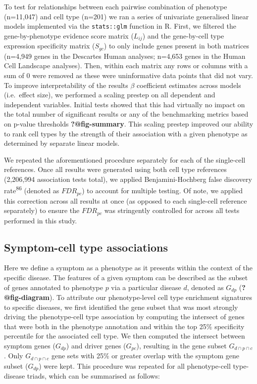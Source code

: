 \documentclass[
]{report}
\begin{document}
To test for relationships between each pairwise combination of phenotype
(n=11,047) and cell type (n=201) we ran a series of univariate
generalised linear models implemented via the \texttt{stats::glm}
function in R. First, we filtered the gene-by-phenotype evidence score
matrix (\(L_{ij}\)) and the gene-by-cell type expression specificity
matrix (\(S_{gc}\)) to only include genes present in both matrices
(n=4,949 genes in the Descartes Human analyses; n=4,653 genes in the
Human Cell Landscape analyses). Then, within each matrix any rows or
columns with a sum of 0 were removed as these were uninformative data
points that did not vary. To improve interpretability of the results
\(\beta\) coefficient estimates across models (i.e.~effect size), we
performed a scaling prestep on all dependent and independent variables.
Initial tests showed that this had virtually no impact on the total
number of significant results or any of the benchmarking metrics based
on p-value thresholds \textbf{?@fig-summary}. This scaling prestep
improved our ability to rank cell types by the strength of their
association with a given phenotype as determined by separate linear
models.

We repeated the aforementioned procedure separately for each of the
single-cell references. Once all results were generated using both cell
type references (2,206,994 association tests total), we applied
Benjamini-Hochberg false discovery rate\textsuperscript{86} (denoted as
\(FDR_{pc}\)) to account for multiple testing. Of note, we applied this
correction across all results at once (as opposed to each single-cell
reference separately) to ensure the \(FDR_{pc}\) was stringently
controlled for across all tests performed in this study.

\subsection{Symptom-cell type
associations}\label{symptom-cell-type-associations}

Here we define a symptom as a phenotype as it presents within the
context of the specific disease. The features of a given symptom can be
described as the subset of genes annotated to phenotype \(p\) via a
particular disease \(d\), denoted as \(G_{dp}\)
(\textbf{?@fig-diagram}). To attribute our phenotype-level cell type
enrichment signatures to specific diseases, we first identified the gene
subset that was most strongly driving the phenotype-cell type
association by computing the intersect of genes that were both in the
phenotype annotation and within the top 25\% specificity percentile for
the associated cell type. We then computed the intersect between symptom
genes (\(G_{dp}\)) and driver genes (\(G_{pc}\)), resulting in the gene
subset \(G_{d \cap p \cap c}\). Only \(G_{d \cap p \cap c}\) gene sets
with 25\% or greater overlap with the symptom gene subset (\(G_{dp}\))
were kept. This procedure was repeated for all phenotype-cell
type-disease triads, which can be summarised as follows:
\end{document}

